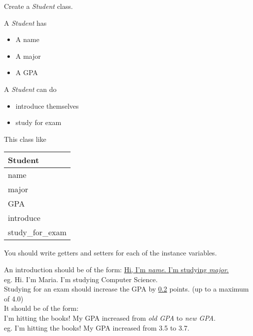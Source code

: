 
	\item Create a \textit{Student} class.\\
	\begin{minipage}{.6\textwidth}		
		A \textit{Student} has
		\begin{itemize}
			\item A name
			\item A major
			\item A GPA	
		\end{itemize}
	
		A \textit{Student} can do
		\begin{itemize}
			\item introduce themselves
			\item study for exam
		\end{itemize}
	\end{minipage} 
	\begin{minipage}{.4\textwidth}
		This class  like
		 
		\vspace*{1em}
		\begin{tabular}{|l|}
			\hline Student\\ \hline
			name\\ major\\ GPA\\ \hline
			introduce\\ study\_for\_exam \\  \hline
		\end{tabular}
	\end{minipage}

	\vspace*{2ex}
	You should write getters and setters for each of the instance variables.\

	An introduction should be of the form: \underline{Hi, I'm  \textit{name}.  
	I'm studying \textit{major}.}\\
	\tab \tab eg. Hi. I'm Maria. I'm studying Computer Science.\\

	Studying for an exam should increase the GPA by \underline{0.2} points. (up to a maximum of 4.0)\\  
	It should be of the form: \\
	I'm hitting the books! My GPA increased from \textit{old GPA} to \textit{new GPA}.\\
	\tab \tab eg. I'm hitting the books! My GPA increased from 3.5 to 3.7.\\





